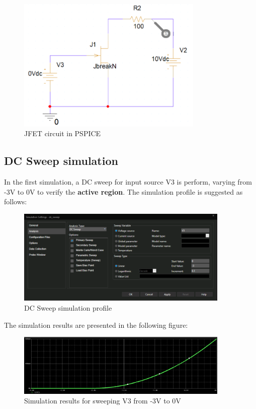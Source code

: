 \begin{figure}[!htp]
    \centering
    \includegraphics[width = 3.5in]{source/picture/bai_6/fet1.PNG}
    \caption{JFET circuit in PSPICE}
    \label{jfet_1}
\end{figure}

\subsection{DC Sweep simulation}
In the first simulation, a DC sweep for input source V3 is perform, varying from -3V to 0V to verify the \textbf{active region}. The simulation profile is suggested as follows:

\begin{figure}[!htp]
    \centering
    \includegraphics[width = 4in]{source/picture/bai_6/jfet2.PNG}
    \caption{DC Sweep simulation profile}
    \label{jfet_2}
\end{figure}

The simulation results are presented in the following figure:
\begin{figure}[!htp]
    \centering
    \includegraphics[width = 4in]{source/picture/bai_6/jfet3.PNG}
    \caption{Simulation results for sweeping V3 from -3V to 0V}
    \label{jfet_3}
\end{figure}


